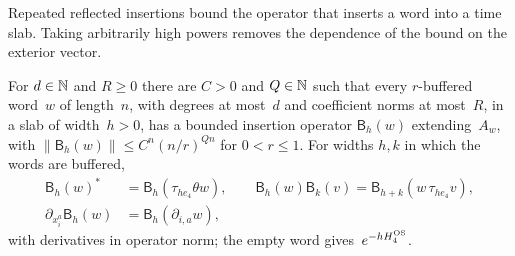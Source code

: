 Repeated reflected insertions bound the operator that inserts a word into a time slab. Taking arbitrarily high powers removes the dependence of the bound on the exterior vector.
\begin{lemma}\label{lem:H1.1}
For $d\in\mathbb{N}$ and $R\ge0$ there are $C>0$ and $Q\in\mathbb{N}$ such that every $r$-buffered word~$w$ of length~$n$, with degrees at most~$d$ and coefficient norms at most~$R$, in a slab of width~$h>0$, has a bounded insertion operator $\mathsf B_h(w)$ extending~$A_w$, with $\|\mathsf B_h(w)\|\le C^n(n/r)^{Qn}$ for $0<r\le1$. For widths $h,k$ in which the words are buffered,
\begin{align}
\mathsf B_h(w)^*&=\mathsf B_h(\tau_{he_4}\theta w),\qquad
\mathsf B_h(w)\mathsf B_k(v)=\mathsf B_{h+k}(w\,\tau_{he_4}v),\label{eq:H-slab-laws}\\
\partial_{x_i^a}\mathsf B_h(w)&=\mathsf B_h(\partial_{i,a}w),\label{eq:H-slab-derivative}
\end{align}
with derivatives in operator norm; the empty word gives~$e^{-hH_4^{\rm OS}}$.
\end{lemma}

